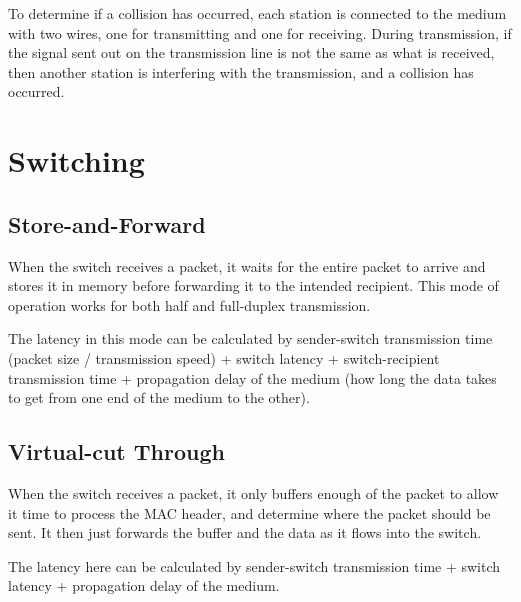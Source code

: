 To determine if a collision has occurred, each station is connected to the medium with two wires, one for transmitting
 and one for receiving. During transmission, if the signal sent out on the transmission line is not the same as what is
 received, then another station is interfering with the transmission, and a collision has occurred.

\section*{Switching}

\subsection*{Store-and-Forward}

When the switch receives a packet, it waits for the entire packet to arrive and stores it in memory before forwarding it
 to the intended recipient. This mode of operation works for both half and full-duplex transmission.

The latency in this mode can be calculated by sender-switch transmission time (packet size / transmission speed) +
 switch latency + switch-recipient transmission time + propagation delay of the medium (how long the data takes to get
 from one end of the medium to the other).

\subsection*{Virtual-cut Through}

When the switch receives a packet, it only buffers enough of the packet to allow it time to process the MAC header, and
 determine where the packet should be sent. It then just forwards the buffer and the data as it flows into the switch.

The latency here can be calculated by sender-switch transmission time + switch latency + propagation delay of the
 medium.